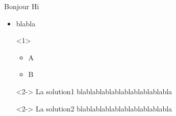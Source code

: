 \documentclass{beamer}
\begin{document}
\begin{frame}{Bonjour}
 Hi
  \begin{overlayarea}{\textwidth}{.5\textheight}
 \begin{itemize}
 \item blabla



     \begin{onlyenv}<1>
             \begin{itemize}
             \item A
             \item B
            \end{itemize}
     \end{onlyenv}

    \begin{block}<2->
    {La solution1} 
        blablablablablablablablablabla
    \end{block}
    \begin{block}<2->
     {La solution2} 
      blablablablablablablablablabla
    \end{block}  



\end{itemize}
 \end{overlayarea}


  \end{frame}
\end{document}

